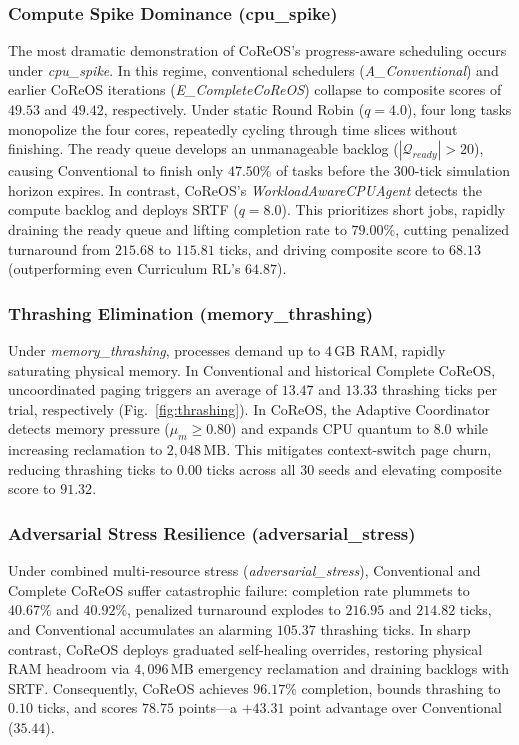 \documentclass[conference]{IEEEtran}
\begin{document}
\subsubsection{Compute Spike Dominance (cpu\_spike)}
The most dramatic demonstration of CoReOS's progress-aware scheduling occurs under \textit{cpu\_spike}. In this regime, conventional schedulers (\textit{A\_Conventional}) and earlier CoReOS iterations (\textit{E\_CompleteCoReOS}) collapse to composite scores of $49.53$ and $49.42$, respectively. Under static Round Robin ($q=4.0$), four long tasks monopolize the four cores, repeatedly cycling through time slices without finishing. The ready queue develops an unmanageable backlog ($|\mathcal{Q}_{ready}| > 20$), causing Conventional to finish only $47.50\%$ of tasks before the $300$-tick simulation horizon expires. In contrast, CoReOS's \textit{WorkloadAwareCPUAgent} detects the compute backlog and deploys SRTF ($q=8.0$). This prioritizes short jobs, rapidly draining the ready queue and lifting completion rate to $\mathbf{79.00\%}$, cutting penalized turnaround from $215.68$ to $\mathbf{115.81}$ ticks, and driving composite score to $\mathbf{68.13}$ (outperforming even Curriculum RL's $64.87$).

\subsubsection{Thrashing Elimination (memory\_thrashing)}
Under \textit{memory\_thrashing}, processes demand up to $4$\,GB RAM, rapidly saturating physical memory. In Conventional and historical Complete CoReOS, uncoordinated paging triggers an average of $13.47$ and $13.33$ thrashing ticks per trial, respectively (Fig.~\ref{fig:thrashing}). In CoReOS, the Adaptive Coordinator detects memory pressure ($\mu_m \ge 0.80$) and expands CPU quantum to $8.0$ while increasing reclamation to $2,048$\,MB. This mitigates context-switch page churn, reducing thrashing ticks to $\mathbf{0.00}$ ticks across all $30$ seeds and elevating composite score to $91.32$.

\subsubsection{Adversarial Stress Resilience (adversarial\_stress)}
Under combined multi-resource stress (\textit{adversarial\_stress}), Conventional and Complete CoReOS suffer catastrophic failure: completion rate plummets to $40.67\%$ and $40.92\%$, penalized turnaround explodes to $216.95$ and $214.82$ ticks, and Conventional accumulates an alarming $105.37$ thrashing ticks. In sharp contrast, CoReOS deploys graduated self-healing overrides, restoring physical RAM headroom via $4,096$\,MB emergency reclamation and draining backlogs with SRTF. Consequently, CoReOS achieves $\mathbf{96.17\%}$ completion, bounds thrashing to $0.10$ ticks, and scores $\mathbf{78.75}$ points—a $+43.31$ point advantage over Conventional ($35.44$).
\end{document}
